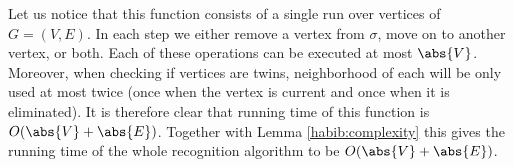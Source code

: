 Let us notice that this function consists of a single run over vertices of $G = (V,E)$. In each step we either remove a vertex from $\sigma$, move on to another vertex, or both. Each of these operations can be executed at most $\abs{V}$. Moreover, when checking if vertices are twins, neighborhood of each will be only used at most twice (once when the vertex is current and once when it is eliminated). It is therefore clear that running time of this function is $O(\abs{V} + \abs{E})$. Together with Lemma \ref{habib:complexity} this gives the running time of the whole recognition algorithm to be $O(\abs{V} + \abs{E})$.